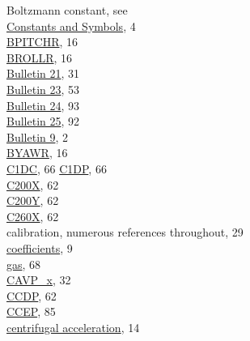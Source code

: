 \documentclass[
]{article}
\begin{document}
Boltzmann constant, see\\
\hspace*{0.333em}\hspace*{0.333em}\href{./1-introduction.html\#constants-and-symbols}{Constants
and Symbols}, 4\\
\href{./3-the-state-of-the-aircraft.html\#bpitchr}{BPITCHR}, 16\\
\href{./3-the-state-of-the-aircraft.html\#brollr}{BROLLR}, 16\\
\href{./4-the-state-of-the-atmosphere.html\#qcx}{Bulletin 21}, 31\\
\href{./4-the-state-of-the-atmosphere.html\#wind}{Bulletin 23}, 53\\
\href{./5-cloud-physics-variables.html\#plwc}{Bulletin 24}, 93\\
\href{./10-obsolete-variables.html\#swtc}{Bulletin 25}, 92\\
\href{./4-the-state-of-the-atmosphere.html\#humidity}{Bulletin 9}, 2\\
\href{./3-the-state-of-the-aircraft.html\#byawr}{BYAWR}, 16\\
\href{./5-cloud-physics-variables.html\#c1dc-c1dp}{C1DC}, 66
\href{./5-cloud-physics-variables.html\#c1dc-c1dp}{C1DP}, 66\\
\href{./5-cloud-physics-variables.html\#size-distribution}{C200X}, 62\\
\href{./5-cloud-physics-variables.html\#size-distribution}{C200Y}, 62\\
\href{./5-cloud-physics-variables.html\#size-distribution}{C260X}, 62\\
calibration, numerous references throughout, 29\\
\hspace*{0.333em}\hspace*{0.333em}\href{./1-general-information-about-data-files.html\#background-information}{coefficients},
9\\
\hspace*{0.333em}\hspace*{0.333em}\href{./6-air-chemistry-measurements.html\#comr-al}{gas},
68\\
\href{./4-the-state-of-the-atmosphere.html\#p-special}{CAVP\_x}, 32\\
\href{./5-cloud-physics-variables.html\#size-distribution}{CCDP}, 62\\
\href{./10-obsolete-variables.html\#loranc}{CCEP}, 85\\
\href{./3-the-state-of-the-aircraft.html\#wp3}{centrifugal
acceleration}, 14\\
\end{document}
